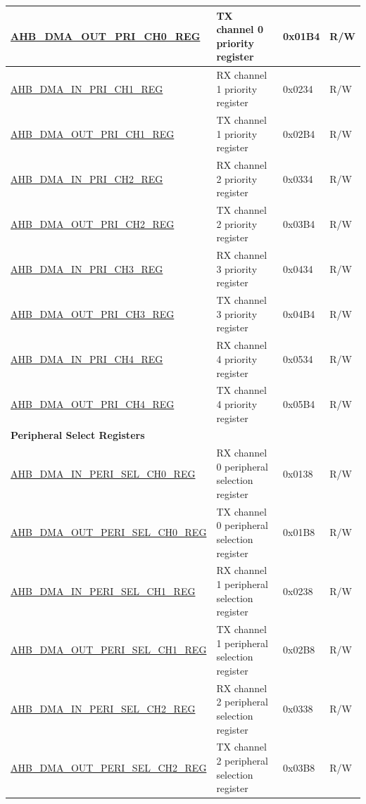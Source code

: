 \begin{longtable}{ | l | p{10cm} | p{1.3cm} | l | }
\hyperref[regdesc:AHBDMAOUTPRICHNREG]{AHB\_DMA\_OUT\_PRI\_CH0\_REG} & TX channel 0 priority register & 0x01B4 & R/W \\ \hline
\hyperref[regdesc:AHBDMAINPRICHNREG]{AHB\_DMA\_IN\_PRI\_CH1\_REG} & RX channel 1 priority register & 0x0234 & R/W \\ \hline
\hyperref[regdesc:AHBDMAOUTPRICHNREG]{AHB\_DMA\_OUT\_PRI\_CH1\_REG} & TX channel 1 priority register & 0x02B4 & R/W \\ \hline
\hyperref[regdesc:AHBDMAINPRICHNREG]{AHB\_DMA\_IN\_PRI\_CH2\_REG} & RX channel 2 priority register & 0x0334 & R/W \\ \hline
\hyperref[regdesc:AHBDMAOUTPRICHNREG]{AHB\_DMA\_OUT\_PRI\_CH2\_REG} & TX channel 2 priority register & 0x03B4 & R/W \\ \hline
\hyperref[regdesc:AHBDMAINPRICHNREG]{AHB\_DMA\_IN\_PRI\_CH3\_REG} & RX channel 3 priority register & 0x0434 & R/W \\ \hline
\hyperref[regdesc:AHBDMAOUTPRICHNREG]{AHB\_DMA\_OUT\_PRI\_CH3\_REG} & TX channel 3 priority register & 0x04B4 & R/W \\ \hline
\hyperref[regdesc:AHBDMAINPRICHNREG]{AHB\_DMA\_IN\_PRI\_CH4\_REG} & RX channel 4 priority register & 0x0534 & R/W \\ \hline
\hyperref[regdesc:AHBDMAOUTPRICHNREG]{AHB\_DMA\_OUT\_PRI\_CH4\_REG} & TX channel 4 priority register & 0x05B4 & R/W \\ \hline
\multicolumn{4}{|l|}{\textbf{Peripheral Select Registers}} \\ \hline
\hyperref[regdesc:AHBDMAINPERISELCHNREG]{AHB\_DMA\_IN\_PERI\_SEL\_CH0\_REG} & RX channel 0 peripheral selection register & 0x0138 & R/W \\ \hline
\hyperref[regdesc:AHBDMAOUTPERISELCHNREG]{AHB\_DMA\_OUT\_PERI\_SEL\_CH0\_REG} & TX channel 0 peripheral selection register & 0x01B8 & R/W \\ \hline
\hyperref[regdesc:AHBDMAINPERISELCHNREG]{AHB\_DMA\_IN\_PERI\_SEL\_CH1\_REG} & RX channel 1 peripheral selection register & 0x0238 & R/W \\ \hline
\hyperref[regdesc:AHBDMAOUTPERISELCHNREG]{AHB\_DMA\_OUT\_PERI\_SEL\_CH1\_REG} & TX channel 1 peripheral selection register & 0x02B8 & R/W \\ \hline
\hyperref[regdesc:AHBDMAINPERISELCHNREG]{AHB\_DMA\_IN\_PERI\_SEL\_CH2\_REG} & RX channel 2 peripheral selection register & 0x0338 & R/W \\ \hline
\hyperref[regdesc:AHBDMAOUTPERISELCHNREG]{AHB\_DMA\_OUT\_PERI\_SEL\_CH2\_REG} & TX channel 2 peripheral selection register & 0x03B8 & R/W \\ \hline

\end{longtable}
